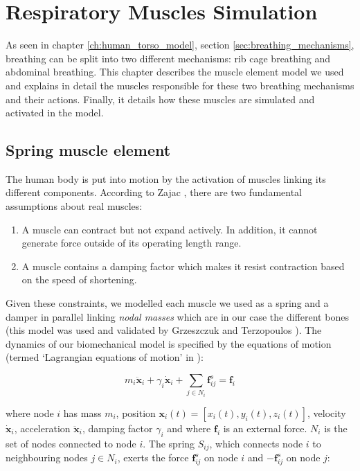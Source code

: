\chapter{\label{ch:simu_resp_mus}Respiratory Muscles Simulation}
As seen in chapter \ref{ch:human_torso_model}, section \ref{sec:breathing_mechanisms}, breathing can be split into two different mechanisms: rib cage breathing and abdominal breathing. This chapter describes the muscle element model we used and explains in detail the muscles responsible for these two breathing mechanisms and their actions. Finally, it details how these muscles are simulated and activated in the model.

\section{\label{sec:spring_muscle_element}Spring muscle element}
The human body is put into motion by the activation of muscles linking its different components. According to Zajac \cite{zajac1989muscle}, there are two fundamental assumptions about real muscles:
\begin{enumerate}
	\item A muscle can contract but not expand actively. In addition, it cannot generate force outside of its operating length range.
	\item A muscle contains a damping factor which makes it resist contraction based on the speed of shortening.
\end{enumerate}

Given these constraints, we modelled each muscle we used as a spring and a damper in parallel linking \emph{nodal masses} which are in our case the different bones (this model was used and validated by Grzeszczuk and Terzopoulos \cite{grzeszczuk1995automated}). The dynamics of our biomechanical model is specified by the equations of motion (termed `Lagrangian equations of motion' in \cite{grzeszczuk1995automated}): 

\begin{equation} \label{eq:lagrangian} m_{i} \ddot{\mathbf{x}}_{i} + \gamma_{i} \dot{\mathbf{x}}_{i} + \displaystyle\sum\limits_{j \in N_{i}} \mathbf{f}_{ij}^s = \mathbf{f}_{i} \end{equation}

where node  $ i $ has mass $ m_{i} $, position $ \mathbf{x}_{i}(t) = [x_{i}(t), y_{i}(t), z_{i}(t)] $, velocity $ \dot{\mathbf{x}}_{i} $, acceleration $ \ddot{\mathbf{x}}_{i} $, damping factor $ \gamma_{i} $ and where $ \mathbf{f}_{i} $ is an external force. $ N_{i} $ is the set of nodes connected to node $ i $. The spring $ S_{ij} $, which connects node $ i $ to neighbouring nodes $ j \in N_{i} $, exerts the force $ \mathbf{f}_{ij}^s $ on node $ i $ and $ - \mathbf{f}_{ij}^s $ on node $ j $:

